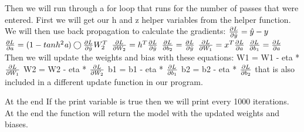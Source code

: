 \documentclass{article}
\begin{document}
\noindent Then we will run through a for loop that runs for the number of passes that were entered. First we will get our h and z helper variables from the helper function. We will then use back propagation to calculate the gradients: 
\newline \newline
$\frac{\partial L}{\partial \hat{y}} = \hat{y} - y \newline \newline$
$\frac{\partial L}{\partial a} = (1 -  tanh^2 \textit{a}) \bigcirc \frac{\partial L}{\partial  \hat{y}}W_{2}^T \newline \newline$
$\frac{\partial L}{\partial W_{2}} = h^T \frac{\partial L}{\partial \hat{y}} \newline \newline$
$\frac{\partial L}{\partial b_{2}}  = \frac{\partial L}{\partial \hat{y}}\newline \newline$
$\frac{\partial L}{\partial W_{1}} = x^T \frac{\partial L}{\partial a} \newline \newline $
$\frac{\partial L}{\partial b_{1}} = \frac{\partial L}{\partial a} \newline \newline$
Then we will update the weights and bias with these equations:
\newline \newline
W1 = W1 - eta * $\frac{\partial L}{\partial W_{1}} \newline \newline$
W2 = W2 - eta * $\frac{\partial L}{\partial W_{2}} \newline \newline$
b1 = b1 - eta * $\frac{\partial L}{\partial b_{1}} \newline \newline$
b2 = b2 - eta * $\frac{\partial L}{\partial b_{2}} \newline \newline$
\newline
that is also included in a different update function in our program. 

At the end If the print variable is true then we will print every 1000 iterations. At the end the function will return the model with the updated weights and biases.
\end{document}
